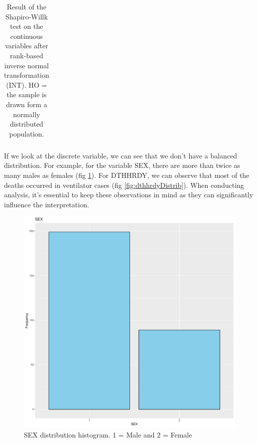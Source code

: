 \documentclass[a4paper, 11pt]{article}
\begin{document}
\begin{multicols}{2}
\begin{table}[H]
\begin{center}
\begin{tabular}{ |c|c|c|c|c|c| }
\end{tabular}
\end{center}
\caption{Result of the Shapiro-Willk test on the continuous variables after rank-based inverse normal transformation (INT). HO = the sample is drawn form a normally distributed population.}
\label{tab:swInt}
\end{table}
If we look at the discrete variable, we can see that we don't have a balanced distribution. 
For example, for the variable SEX, there are more than twice as many males as females (fig \ref{fig:sexDistrib}). 
For DTHHRDY, we can observe that most of the deaths occurred in ventilator cases (fig \ref{fig:dthhrdyDistrib}). 
When conducting analysis, it's essential to keep these observations in mind as they can significantly influence the interpretation. 

\begin{figure}[H]
	\centering
	\includegraphics[width=\columnwidth]{figures/clinical_data_var_dist/SEX}
	\caption{SEX distribution histogram. 1 = Male and 2 = Female}
	\label{fig:sexDistrib}
\end{figure}


\end{multicols}
\end{document}
